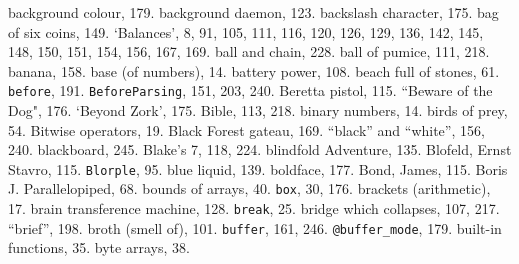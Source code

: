 background colour, 179.
background daemon, 123.
backslash character, 175.
bag of six coins, 149.
`Balances', 8, 91, 105, 111, 116, 120, 126, 129, 136, 142, 145, 148, 150, 151, 154, 156, 167, 169.
ball and chain, 228.
ball of pumice, 111, 218.
banana, 158.
base (of numbers), 14.
battery power, 108.
beach full of stones, 61.
{{\tt before}}, 191.
{{\tt BeforeParsing}}, 151, 203, 240.
Beretta pistol, 115.
``Beware of the Dog", 176.
`Beyond Zork', 175.
Bible, 113, 218.
binary numbers, 14.
birds of prey, 54.
Bitwise operators, 19.
Black Forest gateau, 169.
``black'' and ``white'', 156, 240.
blackboard, 245.
Blake's 7, 118, 224.
blindfold Adventure, 135.
Blofeld, Ernst Stavro, 115.
{{\tt Blorple}}, 95.
blue liquid, 139.
boldface, 177.
Bond, James, 115.
Boris J. Parallelopiped, 68.
bounds of arrays, 40.
{{\tt box}}, 30, 176.
brackets (arithmetic), 17.
brain transference machine, 128.
{{\tt break}}, 25.
bridge which collapses, 107, 217.
``brief'', 198.
broth (smell of), 101.
{{\tt buffer}}, 161, 246.
{{\tt @buffer\_mode}}, 179.
built-in functions, 35.
byte arrays, 38.

